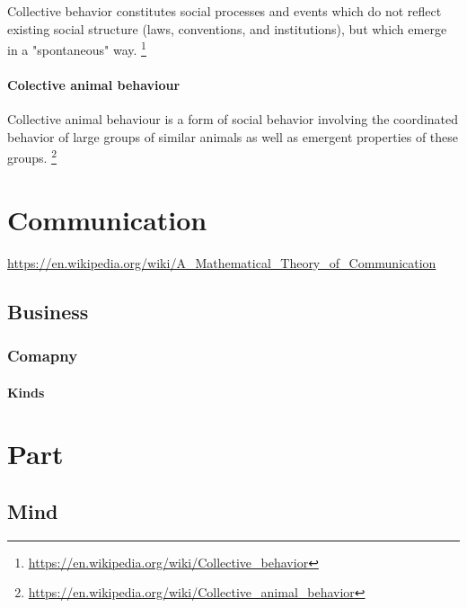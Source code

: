 \documentclass{book}
\providecommand{\seeherefooter}[1]{\footnote{\url{#1}}}
\begin{document}

Collective behavior constitutes social processes and events which do not reflect existing social structure (laws, conventions, and institutions), but which emerge in a "spontaneous" way. \seeherefooter{https://en.wikipedia.org/wiki/Collective_behavior}
    
    
    \paragraph{Colective animal behaviour}
        Collective animal behaviour is a form of social behavior involving the coordinated behavior of large groups of similar animals as well as emergent properties of these groups.
        \seeherefooter{https://en.wikipedia.org/wiki/Collective_animal_behavior}

\section{Communication}


\url{https://en.wikipedia.org/wiki/A_Mathematical_Theory_of_Communication}

\subsection{Business}

\subsubsection{Comapny}

\paragraph{Kinds}


% 


% 

\section{Part}

\subsection{Mind}
\end{document}
